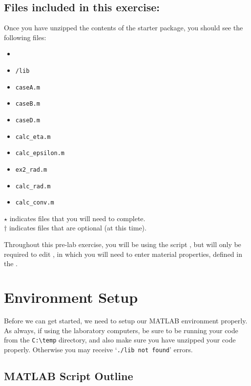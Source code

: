 \documentclass[11pt, letterpaper]{article}
\begin{document}
\subsection*{Files included in this exercise:}
Once you have unzipped the contents of the starter package, you should see the following files:

\begin{itemize}
\renewcommand\labelitemi{-- }
   \item {}
    \item \texttt{/lib}
    \item  \texttt{caseA.m}
\renewcommand\labelitemi{[$\star$]}
    \item \texttt{caseB.m}
    \item \texttt{caseD.m} 
    \item \texttt{calc\_eta.m} 
    \item \texttt{calc\_epsilon.m} 
\renewcommand\labelitemi{[$\dag$]}
    \item \texttt{ex2\_rad.m} 
    \item \texttt{calc\_rad.m}
    \item \texttt{calc\_conv.m}  
\end{itemize}

\noindent
$\star$ indicates files that you will need to complete.\\
$\dag$ indicates files that are optional (at this time).

\n
Throughout this pre-lab exercise, you will be using the script , but will only be required to edit , in which you will need to enter material properties, defined in the .


\setcounter{section}{-1}
\section{Environment Setup}
Before we can get started, we need to setup our MATLAB environment properly. As always, if using the laboratory computers, be sure to be running your code from the \texttt{C:\textbackslash temp} directory, and also make sure you have unzipped your code properly. Otherwise you may receive `\texttt{./lib not found}' errors.

\subsection{MATLAB Script Outline}
\end{document}
